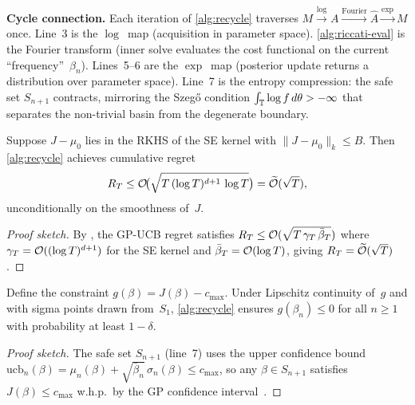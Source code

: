 \textcolor{CycleColor}{\textbf{Cycle connection.}}
Each iteration of \cref{alg:recycle} traverses
$M \xrightarrow{\log} A \xrightarrow{\text{Fourier}} \hat{A}
\xrightarrow{\exp} M$ once.
Line~3 is the $\log$~map (acquisition in parameter space).
\cref{alg:riccati-eval} is the Fourier transform (inner solve evaluates
the cost functional on the current ``frequency''~$\beta_n$).
Lines~5--6 are the $\exp$~map (posterior update returns a distribution
over parameter space).
Line~7 is the entropy compression: the safe set $S_{n+1}$ contracts,
mirroring the Szeg\H{o} condition
$\int_{\mathbb{T}} \log f\,d\theta > -\infty$ that separates the non-trivial
basin from the degenerate boundary.

\begin{proposition}
\label{prop:gp-regret}
Suppose $J - \mu_0$ lies in the RKHS of the SE kernel with $\|J - \mu_0\|_k \leq B$.
Then \cref{alg:recycle} achieves cumulative regret
\[
R_T \leq \mathcal{O}\!\bigl(\sqrt{T\,(\log T)^{d+1}\,\log T}\bigr)
= \widetilde{\mathcal{O}}(\sqrt{T}),
\]
unconditionally on the smoothness of~$J$.
\end{proposition}

\begin{proof}[Proof sketch]
By \cite[Theorem~1]{SrinivasGPUCB}, the GP-UCB regret satisfies
$R_T \leq \mathcal{O}(\sqrt{T\,\gamma_T\,\bar\beta_T})$ where
$\gamma_T = \mathcal{O}((\log T)^{d+1})$ for the SE kernel and
$\bar\beta_T = \mathcal{O}(\log T)$, giving $R_T = \widetilde{\mathcal{O}}(\sqrt{T})$.
\end{proof}

\begin{proposition}
\label{prop:safe-gp}
Define the constraint $g(\beta) = J(\beta) - c_{\max}$.
Under Lipschitz continuity of~$g$ and with sigma points
drawn from~$S_1$,
\cref{alg:recycle} ensures $g(\beta_n) \leq 0$ for all $n \geq 1$
with probability at least $1-\delta$.
\end{proposition}

\begin{proof}[Proof sketch]
The safe set $S_{n+1}$ (line~7) uses the upper confidence bound
$\mathrm{ucb}_n(\beta)
= \mu_n(\beta) + \sqrt{\bar\beta_n}\,\sigma_n(\beta)
\leq c_{\max}$, so any $\beta \in S_{n+1}$ satisfies
$J(\beta) \leq c_{\max}$ w.h.p.\ by the GP confidence
interval~\cite{SuiSafeOpt,BerkenkampSafeMPC}.
\end{proof}

